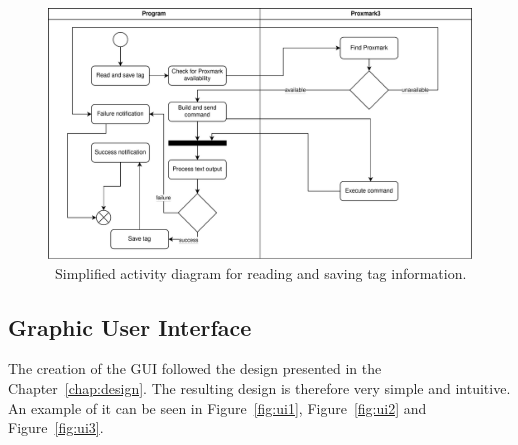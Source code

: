 \begin{figure}[ht]
  \centering
  \includegraphics[width=\textwidth]{text/implementation/activity_diagram.pdf}
  \caption{~Simplified activity diagram for reading and saving tag information.}
  \label{fig:activitydiagram}
\end{figure}

\subsection{Graphic User Interface}

The creation of the GUI followed the design presented in the Chapter~\ref{chap:design}. The resulting design is therefore very simple and intuitive. An example of it can be seen in Figure~\ref{fig:ui1}, Figure~\ref{fig:ui2} and Figure~\ref{fig:ui3}.

